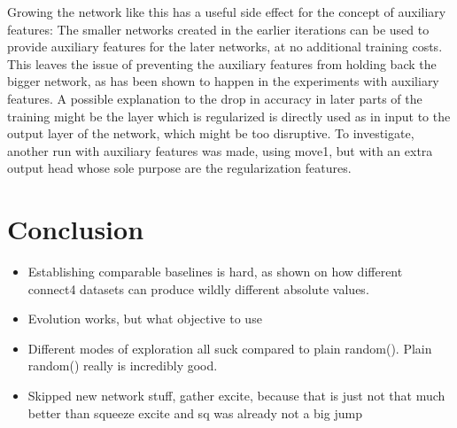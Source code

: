 \documentclass[12pt,onecolumn,oneside,titlepage]{article}
\begin{document}
Growing the network like this has a useful side effect for the concept of auxiliary features: The smaller networks created in the earlier iterations can be used to provide auxiliary features for the later networks, at no additional training costs.
This leaves the issue of preventing the auxiliary features from holding back the bigger network, as has been shown to happen in the experiments with auxiliary features.
A possible explanation to the drop in accuracy in later parts of the training might be the layer which is regularized is directly used as in input to the output layer of the network, which might be too disruptive. To investigate, another run with auxiliary features was
made, using move1, but with an extra output head whose sole purpose are the regularization features. 





\section{Conclusion}

\begin{itemize}
 \item Establishing comparable baselines is hard, as shown on how different connect4 datasets can produce wildly different absolute values.
 \item Evolution works, but what objective to use
 \item Different modes of exploration all suck compared to plain random(). Plain random() really is incredibly good.
 \item Skipped new network stuff, gather excite, because that is just not that much better than squeeze excite and sq was already not a big jump
\end{itemize}



\pagebreak




\end{document}
